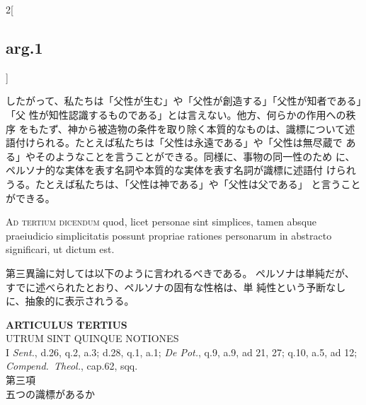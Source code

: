 \documentclass[paper=a4paper,fontsize=10pt,jafontsize=9pt,titlepage]{jlreq}
\begin{document}
\begin{paracol}{2}[\subsection{arg.1}]
\switchcolumn

したがって、私たちは「父性が生む」や「父性が創造する」「父性が知者である」「父
 性が知性認識するものである」とは言えない。他方、何らかの作用への秩序
 をもたず、神から被造物の条件を取り除く本質的なものは、識標について述
 語付けられる。たとえば私たちは「父性は永遠である」や「父性は無尽蔵で
 ある」やそのようなことを言うことができる。同様に、事物の同一性のため
 に、ペルソナ的な実体を表す名詞や本質的な実体を表す名詞が識標に述語付
 けられうる。たとえば私たちは、「父性は神である」や「父性は父である」
 と言うことができる。

\switchcolumn*[\subsection{ad.3}]

{\scshape Ad tertium dicendum} quod, licet personae sint simplices, tamen absque
praeiudicio simplicitatis possunt propriae rationes personarum in
abstracto significari, ut dictum est.

\switchcolumn

第三異論に対しては以下のように言われるべきである。
ペルソナは単純だが、すでに述べられたとおり、ペルソナの固有な性格は、単
 純性という予断なしに、抽象的に表示されうる。

\end{paracol}
\newpage


\begin{center}
{\Large {\bfseries ARTICULUS TERTIUS}}\\
{\large UTRUM SINT QUINQUE NOTIONES}\\
{\footnotesize I {\itshape Sent.}, d.26, q.2, a.3; d.28, q.1, a.1;
 {\itshape De Pot.}, q.9, a.9, ad 21, 27; q.10, a.5, ad 12; {\itshape
 Compend.~Theol.}, cap.62, sqq.}\\
{\Large 第三項\\五つの識標があるか}
\end{center}


{}
\setcounter{section}{3}
\setcounter{subsection}{0}
\end{document}
